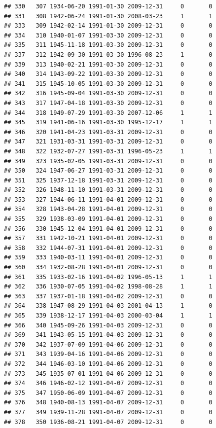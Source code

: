 \documentclass[
]{book}
\theoremstyle{definition}
\theoremstyle{definition}
\theoremstyle{definition}
\theoremstyle{definition}
\theoremstyle{remark}
\begin{document}
\begin{verbatim}
## 330   307 1934-06-20 1991-01-30 2009-12-31     0       0
## 331   308 1942-06-24 1991-01-30 2008-03-23     1       1
## 333   309 1942-02-14 1991-01-30 2009-12-31     0       0
## 334   310 1940-01-07 1991-03-30 2009-12-31     0       0
## 335   311 1945-11-18 1991-03-30 2009-12-31     0       0
## 337   312 1942-09-30 1991-03-30 1996-08-23     1       0
## 339   313 1940-02-21 1991-03-30 2009-12-31     0       0
## 340   314 1943-09-22 1991-03-30 2009-12-31     0       0
## 341   315 1945-10-05 1991-03-30 2009-12-31     0       0
## 342   316 1945-09-04 1991-03-30 2009-12-31     0       0
## 343   317 1947-04-18 1991-03-30 2009-12-31     0       0
## 344   318 1949-07-29 1991-03-30 2007-12-06     1       1
## 345   319 1941-06-16 1991-03-30 1995-12-17     1       1
## 346   320 1941-04-23 1991-03-31 2009-12-31     0       0
## 347   321 1931-03-31 1991-03-31 2009-12-31     0       0
## 348   322 1932-07-27 1991-03-31 1996-05-23     1       1
## 349   323 1935-02-05 1991-03-31 2009-12-31     0       0
## 350   324 1947-06-27 1991-03-31 2009-12-31     0       0
## 351   325 1937-12-18 1991-03-31 2009-12-31     0       0
## 352   326 1948-11-10 1991-03-31 2009-12-31     0       0
## 353   327 1944-06-11 1991-04-01 2009-12-31     0       0
## 354   328 1943-04-28 1991-04-01 2009-12-31     0       0
## 355   329 1938-03-09 1991-04-01 2009-12-31     0       0
## 356   330 1945-12-04 1991-04-01 2009-12-31     0       0
## 357   331 1942-10-21 1991-04-01 2009-12-31     0       0
## 358   332 1944-07-31 1991-04-01 2009-12-31     0       0
## 359   333 1940-03-11 1991-04-01 2009-12-31     0       0
## 360   334 1932-08-28 1991-04-01 2009-12-31     0       0
## 361   335 1933-02-16 1991-04-02 1996-05-13     1       1
## 362   336 1930-07-05 1991-04-02 1998-08-28     1       1
## 363   337 1937-01-18 1991-04-02 2009-12-31     0       0
## 364   338 1947-08-29 1991-04-03 2001-04-13     1       0
## 365   339 1938-12-17 1991-04-03 2000-03-04     1       1
## 366   340 1945-09-26 1991-04-03 2009-12-31     0       0
## 369   341 1943-05-15 1991-04-03 2009-12-31     0       0
## 370   342 1937-07-09 1991-04-06 2009-12-31     0       0
## 371   343 1939-04-16 1991-04-06 2009-12-31     0       0
## 372   344 1946-03-10 1991-04-06 2009-12-31     0       0
## 373   345 1935-07-01 1991-04-06 2009-12-31     0       0
## 374   346 1946-02-12 1991-04-07 2009-12-31     0       0
## 375   347 1950-06-09 1991-04-07 2009-12-31     0       0
## 376   348 1940-08-13 1991-04-07 2009-12-31     0       0
## 377   349 1939-11-28 1991-04-07 2009-12-31     0       0
## 378   350 1936-08-21 1991-04-07 2009-12-31     0       0

\end{verbatim}
\end{document}
